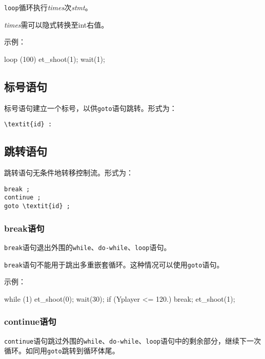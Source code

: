 \documentclass[UTF8]{ctexart}
\begin{document}
\verb|loop|循环执行\textit{times}次\textit{stmt}。

\textit{times}需可以隐式转换至int右值。

示例：

\begin{MUAvbt}
loop (100) {
	et_shoot(1);
	wait(1);
}
\end{MUAvbt}

\subsection{标号语句}

标号语句建立一个标号，以供\verb|goto|语句跳转。形式为：

\begin{Verbatim}[frame=single, rulecolor=\color{magenta}, commandchars=\\\{\}]
\textit{id} :
\end{Verbatim}

\subsection{跳转语句}

跳转语句无条件地转移控制流。形式为：

\begin{Verbatim}[frame=single, rulecolor=\color{magenta}, commandchars=\\\{\}]
break ;
continue ;
goto \textit{id} ;
\end{Verbatim}

\subsubsection{break语句}

\verb|break|语句退出外围的\verb|while|、\verb|do-while|、\verb|loop|语句。

\verb|break|语句不能用于跳出多重嵌套循环。这种情况可以使用\verb|goto|语句。

示例：

\begin{MUAvbt}
while (1) {
	et_shoot(0);
	wait(30);
	if (Yplayer <= 120.)
		break;
}
et_shoot(1);
\end{MUAvbt}

\subsubsection{continue语句}

\verb|continue|语句跳过外围的\verb|while|、\verb|do-while|、\verb|loop|语句中的剩余部分，继续下一次循环。如同用\verb|goto|跳转到循环体尾。
\end{document}
